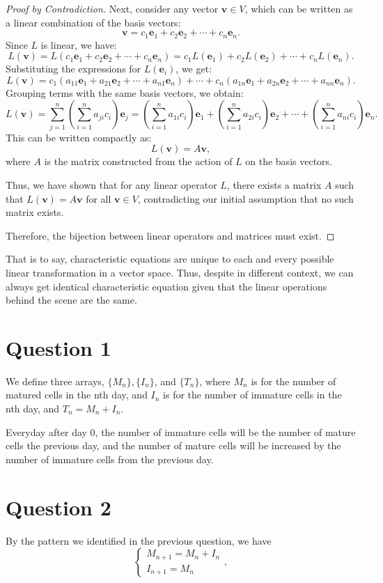 \documentclass[12pt,a4paper]{article}
\begin{document}
\begin{proof}[Proof by Contradiction]
Next, consider any vector \( \mathbf{v} \in V \), which can be written as a linear combination of the basis vectors:
\[
\mathbf{v} = c_1 \mathbf{e}_1 + c_2 \mathbf{e}_2 + \cdots + c_n \mathbf{e}_n.
\]
Since \( L \) is linear, we have:
\[
L(\mathbf{v}) = L(c_1 \mathbf{e}_1 + c_2 \mathbf{e}_2 + \cdots + c_n \mathbf{e}_n) = c_1 L(\mathbf{e}_1) + c_2 L(\mathbf{e}_2) + \cdots + c_n L(\mathbf{e}_n).
\]
Substituting the expressions for \( L(\mathbf{e}_i) \), we get:
\[
L(\mathbf{v}) = c_1 (a_{11} \mathbf{e}_1 + a_{21} \mathbf{e}_2 + \cdots + a_{n1} \mathbf{e}_n) + \cdots + c_n (a_{1n} \mathbf{e}_1 + a_{2n} \mathbf{e}_2 + \cdots + a_{nn} \mathbf{e}_n).
\]
Grouping terms with the same basis vectors, we obtain:
\[
L(\mathbf{v}) = \sum_{j=1}^n\left(\sum_{i=1}^n a_{j i} c_i\right) \mathbf{e}_j
= \left( \sum_{i=1}^n a_{1i} c_i \right) \mathbf{e}_1 + \left( \sum_{i=1}^n a_{2i} c_i \right) \mathbf{e}_2 + \cdots + \left( \sum_{i=1}^n a_{ni} c_i \right) \mathbf{e}_n.
\]
This can be written compactly as:
\[
L(\mathbf{v}) = A \mathbf{v},
\]
where \( A \) is the matrix constructed from the action of \( L \) on the basis vectors.

Thus, we have shown that for any linear operator \( L \), there exists a matrix \( A \) such that \( L(\mathbf{v}) = A \mathbf{v} \) for all \( \mathbf{v} \in V \), contradicting our initial assumption that no such matrix exists.

Therefore, the bijection between linear operators and matrices must exist.
\end{proof}

That is to say, characteristic equations are unique to each and every possible linear transformation in a vector space. Thus, despite in different context, we can always get identical characteristic equation given that the linear operations behind the scene are the same.

\section*{Question 1}
We define three arrays, $\{M_n\}, \{I_n\}$, and $\{T_n\}$, where $M_n$ is for the number of matured cells in the nth day, and $I_n$ is for the number of immature cells in the nth day, and $T_n = M_n+I_n$.

Everyday after day 0, the number of immature cells will be the number of mature cells the previous day, and the number of mature cells will be increased by the number of immature cells from the previous day.
\section*{Question 2}
By the pattern we identified in the previous question, we have
\begin{equation}
    \begin{cases}
        M_{n+1} = M_n + I_n\\
        I_{n+1} = M_n
    \end{cases},
\end{equation}
\end{document}
